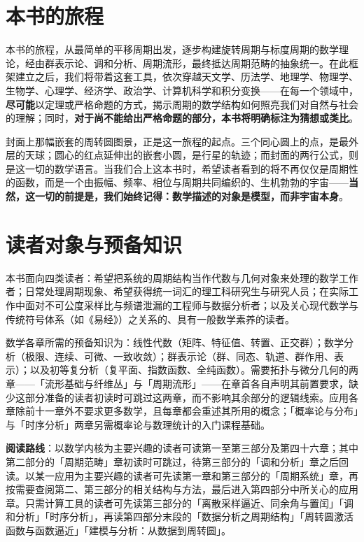 \section*{本书的旅程}

本书的旅程，从最简单的平移周期出发，逐步构建旋转周期与标度周期的数学理论，经由群表示论、调和分析、周期流形，最终抵达周期范畴的抽象统一。在此框架建立之后，我们将带着这套工具，依次穿越天文学、历法学、地理学、物理学、生物学、心理学、经济学、政治学、计算机科学和积分变换——在每一个领域中，\textbf{尽可能}以定理或严格命题的方式，揭示周期的数学结构如何照亮我们对自然与社会的理解；同时，\textbf{对于尚不能给出严格命题的部分，本书将明确标注为猜想或类比}。

封面上那幅嵌套的周转圆图景，正是这一旅程的起点。三个同心圆上的点，是最外层的天球；圆心的红点延伸出的嵌套小圆，是行星的轨迹；而封面的两行公式，则是这一切的数学语言。当我们合上这本书时，希望读者看到的将不再仅仅是周期性的函数，而是一个由振幅、频率、相位与周期共同编织的、生机勃勃的宇宙——\textbf{当然，这一切的前提是，我们始终记得：数学描述的对象是模型，而非宇宙本身}。

\section*{读者对象与预备知识}

本书面向四类读者：希望把系统的周期结构当作代数与几何对象来处理的数学工作者；日常处理周期现象、希望获得统一词汇的理工科研究生与研究人员；在实际工作中面对不可公度采样比与频谱泄漏的工程师与数据分析者；以及关心现代数学与传统符号体系（如《易经》）之关系的、具有一般数学素养的读者。

数学各章所需的预备知识为：线性代数（矩阵、特征值、转置、正交群）；数学分析（极限、连续、可微、一致收敛）；群表示论（群、同态、轨道、群作用、表示）；以及初等复分析（复平面、指数函数、全纯函数）。需要拓扑与微分几何的两章——「流形基础与纤维丛」与「周期流形」——在章首各自声明其前置要求，缺少这部分准备的读者初读时可跳过这两章，而不影响其余部分的逻辑线索。应用各章除前十一章外不要求更多数学，且每章都会重述其所用的概念；「概率论与分布」与「时序分析」两章另需概率论与数理统计的入门课程基础。

\textbf{阅读路线}：以数学内核为主要兴趣的读者可读第一至第三部分及第四十六章；其中第二部分的「周期范畴」章初读时可跳过，待第三部分的「调和分析」章之后回读。以某一应用为主要兴趣的读者可先读第一章和第三部分的「周期系统」章，再按需要查阅第二、第三部分的相关结构与方法，最后进入第四部分中所关心的应用章。只需计算工具的读者可先读第三部分的「离散采样逼近、同余角与置闰」「调和分析」「时序分析」，再读第四部分末段的「数据分析之周期结构」「周转圆激活函数与函数逼近」「建模与分析：从数据到周转圆」。

